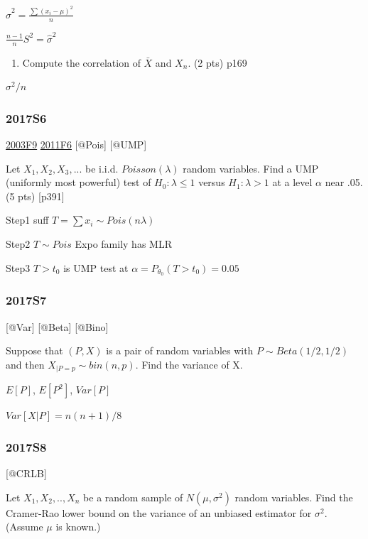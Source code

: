 \documentclass[6pt,twocolumn,Portrait]{article}
\providecommand{\tightlist}{%
  \setlength{\itemsep}{0pt}\setlength{\parskip}{0pt}}
\begin{document}
\(\hat\sigma^2=\frac{\sum(x_i-\mu)^2}{n}\)

\(\frac{n-1}{n}S^2=\hat\sigma^2\)

\begin{enumerate}
\def\labelenumi{(\alph{enumi})}
\setcounter{enumi}{1}
\tightlist
\item
  Compute the correlation of \(\bar X\) and \(X_n\). (2 pts) p169
\end{enumerate}

\(\sigma^2/n\)

\hypertarget{s6-4}{%
\subsubsection{2017S6}\label{s6-4}}

\protect\hyperlink{f9-1}{2003F9} \protect\hyperlink{f6-4}{2011F6}
{[}@Pois{]} {[}@UMP{]}

Let \(X_1,X_2,X_3,...\) be i.i.d. \(Poisson(\lambda)\) random variables.
Find a UMP (uniformly most powerful) test of \(H_0:\lambda\le1\) versus
\(H_1:\lambda>1\) at a level \(\alpha\) near .05. (5 pts) {[}p391{]}

Step1 suff \(T=\sum x_i\sim Pois(n\lambda)\)

Step2 \(T\sim Pois\) Expo family has MLR

Step3 \(T>t_0\) is UMP test at \(\alpha=P_{\theta_0}(T>t_0)=0.05\)

\hypertarget{s7-3}{%
\subsubsection{2017S7}\label{s7-3}}

{[}@Var{]} {[}@Beta{]} {[}@Bino{]}

Suppose that \((P,X)\) is a pair of random variables with
\(P\sim Beta(1/2, 1/2)\) and then \(X_{|P=p}\sim bin(n,p)\). Find the
variance of X.

\(E[P]\), \(E[P^2]\), \(Var[P]\)

\(Var[X|P]=n(n+1)/8\)

\hypertarget{s8-3}{%
\subsubsection{2017S8}\label{s8-3}}

{[}@CRLB{]}

Let \(X_1,X_2,..,X_n\) be a random sample of \(N(\mu,\sigma^2)\) random
variables. Find the Cramer-Rao lower bound on the variance of an
unbiased estimator for \(\sigma^2\). (Assume \(\mu\) is known.)
\end{document}
